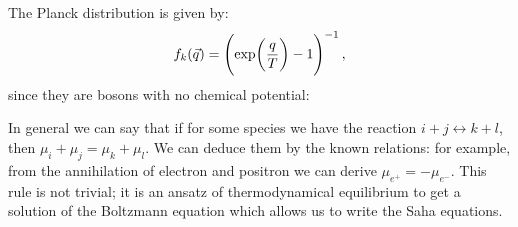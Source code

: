 \documentclass[main.tex]{subfiles}
\begin{document}
The Planck distribution is given by: 
%
\begin{equation}
  f_k(\vec{q}) = \qty(\exp(\frac{q}{T}) -1 )^{-1}
\,,
\end{equation}
%
since they are bosons with no chemical potential:

In general we can say that if for some species we have the reaction \(i+j \leftrightarrow k+l\), then \(\mu _i + \mu _j = \mu _k + \mu _l\). We can deduce them by the known relations: for example, from the annihilation of electron and positron we can derive \(\mu _{e^{+}} = - \mu_{e^{-}}\).
This rule is not trivial; it is an ansatz of thermodynamical equilibrium to get a solution of the Boltzmann equation which allows us to write the Saha equations.
\end{document}
